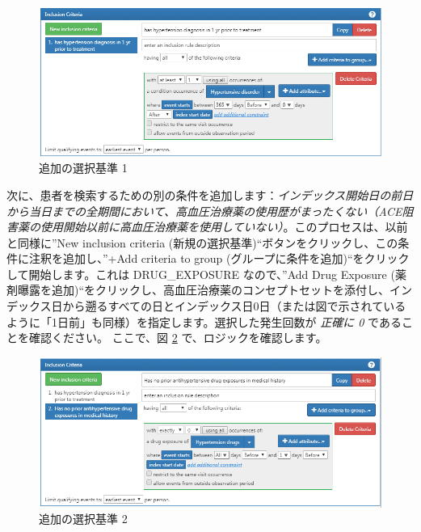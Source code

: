 \documentclass[
  11pt]{book}
\theoremstyle{definition}
\theoremstyle{definition}
\theoremstyle{definition}
\theoremstyle{definition}
\theoremstyle{remark}
\begin{document}
\begin{figure}

{\centering \includegraphics[width=1\linewidth]{images/Cohorts/ATLAS-IC1} 

}

\caption{追加の選択基準 1}\label{fig:ATLASIC1}
\end{figure}

次に、患者を検索するための別の条件を追加します：\emph{インデックス開始日の前日から当日までの全期間において、高血圧治療薬の使用歴がまったくない（ACE阻害薬の使用開始以前に高血圧治療薬を使用していない）}。このプロセスは、以前と同様に''New inclusion criteria (新規の選択基準)``ボタンをクリックし、この条件に注釈を追加し、''+Add criteria to group (グループに条件を追加)``をクリックして開始します。これは DRUG\_EXPOSURE なので、''Add Drug Exposure (薬剤曝露を追加)``をクリックし、高血圧治療薬のコンセプトセットを添付し、インデックス日から遡るすべての日とインデックス日0日（または図で示されているように「1日前」も同様）を指定します。選択した発生回数が \emph{正確に 0} であることを確認ください。 ここで、図 \ref{fig:ATLASIC2} で、ロジックを確認します。

\begin{figure}

{\centering \includegraphics[width=1\linewidth]{images/Cohorts/ATLAS-IC2} 

}

\caption{追加の選択基準 2}\label{fig:ATLASIC2}
\end{figure}
\end{document}
